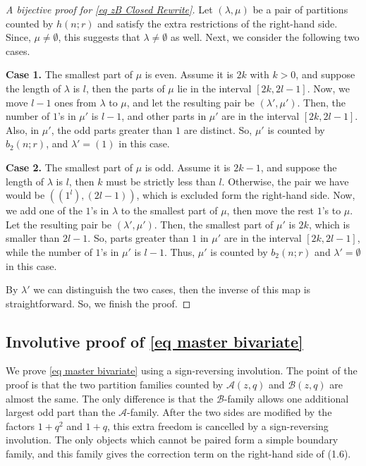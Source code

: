 \documentclass[10pt,a4paper]{amsart}
\numberwithin{equation}{section}
\begin{document}
\begin{proof}[A bijective proof for \eqref{eq zB Closed Rewrite}] Let $(\lambda,\mu)$ be a pair of partitions counted by $h(n;r)$ and satisfy the extra restrictions of the right-hand side. Since, $\mu\neq\emptyset$, this suggests that $\lambda\neq\emptyset$ as well. Next, we consider the following two cases.

\textbf{Case 1.} The smallest part of $\mu$ is even. Assume it is $2k$ with $k>0$, and suppose the length of $\lambda$ is $l$, then the parts of $\mu$ lie in the interval $[2k,2l-1]$. Now, we move $l-1$ ones from $\lambda$ to $\mu$, and let the resulting pair be $(\lambda',\mu')$. Then, the number of $1$'s in $\mu'$ is $l-1$, and other parts in $\mu'$ are in the interval $[2k,2l-1]$. Also, in $\mu'$, the odd parts greater than $1$ are distinct. So, $\mu'$ is counted by $b_2(n;r)$, and $\lambda'=(1)$ in this case.

\textbf{Case 2.} The smallest part of $\mu$ is odd. Assume it is $2k-1$, and suppose the length of $\lambda$ is $l$, then $k$ must be strictly less than $l$. Otherwise, the pair we have would be $((1^l),(2l-1))$, which is excluded form the right-hand side. Now, we add one of the $1$'s in $\lambda$ to the smallest part of $\mu$, then move the rest $1$'s to $\mu$. Let the resulting pair be $(\lambda',\mu')$. Then, the smallest part of $\mu'$ is $2k$, which is smaller than $2l-1$. So, parts greater than $1$ in $\mu'$ are in the interval $[2k,2l-1]$, while the number of $1$'s in $\mu'$ is $l-1$. Thus, $\mu'$ is counted by $b_2(n;r)$ and $\lambda'=\emptyset$ in this case.

By $\lambda'$ we can distinguish the two cases, then the inverse of this map is straightforward. So, we finish the proof. 
\end{proof}


\subsection{Involutive proof of \eqref{eq master bivariate}} 
We prove \eqref{eq master bivariate} using a sign-reversing involution. The point of the proof is that the two partition families counted by
\(\mathcal A(z,q)\) and \(\mathcal B(z,q)\) are almost the same.  The only
difference is that the \(\mathcal{B}\)-family allows one additional largest odd part than the $\mathcal{A}$-family.
After the two sides are modified by the factors \(1+q^2\) and \(1+q\), this
extra freedom is cancelled by a sign-reversing involution.  The only objects
which cannot be paired form a simple boundary family, and this family gives
the correction term on the right-hand side of (1.6).
\end{document}
